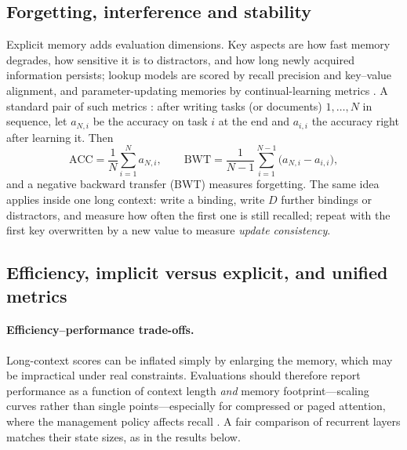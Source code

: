 \subsection{Forgetting, interference and stability}\label{sec:c02-forgetting}

Explicit memory adds evaluation dimensions. Key aspects are how fast memory degrades, how sensitive
it is to distractors, and how long newly acquired information persists; lookup models are scored by
recall precision and key--value alignment, and parameter-updating memories by continual-learning
metrics \citep[\S V-C]{zhoubian2026memory}. A standard pair of such metrics
\citep{c02-lopezpaz2017gem}: after writing tasks (or documents) $1,\dots,N$ in sequence, let
$a_{N,i}$ be the accuracy on task $i$ at the end and $a_{i,i}$ the accuracy right after learning it.
Then
\begin{equation}\label{eq:c02-bwt}
  \mathrm{ACC} = \frac{1}{N}\sum_{i=1}^{N}a_{N,i}, \qquad
  \mathrm{BWT} = \frac{1}{N-1}\sum_{i=1}^{N-1}\big(a_{N,i} - a_{i,i}\big),
\end{equation}
and a negative backward transfer (BWT) measures forgetting. The same idea applies inside one long
context: write a binding, write $D$ further bindings or distractors, and measure how often the first
one is still recalled; repeat with the first key overwritten by a new value to measure \emph{update
consistency}.

\subsection{Efficiency, implicit versus explicit, and unified metrics}\label{sec:c02-unified}

\paragraph{Efficiency--performance trade-offs.} Long-context scores can be inflated simply by
enlarging the memory, which may be impractical under real constraints. Evaluations should therefore
report performance as a function of context length \emph{and} memory footprint---scaling curves
rather than single points---especially for compressed or paged attention, where the management
policy affects recall \citep[\S V-C]{zhoubian2026memory}. A fair comparison of recurrent layers
matches their state sizes, as in the results below.

